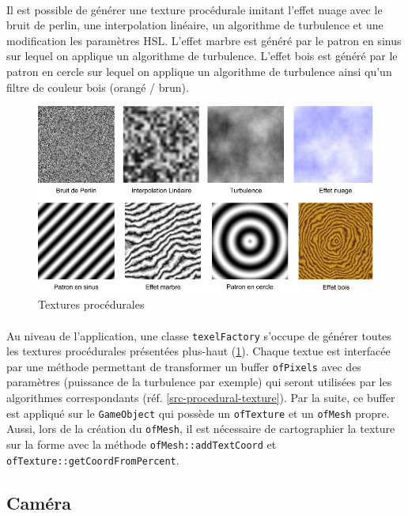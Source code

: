 \paragraph{} Il est possible de générer une texture procédurale imitant l'effet nuage avec le bruit de perlin, une interpolation linéaire, un algorithme de turbulence et une modification les paramètres HSL. L'effet marbre est généré par le patron en sinus sur lequel on applique un algorithme de turbulence. L'effet bois est généré par le patron en cercle sur lequel on applique un algorithme de turbulence ainsi qu'un filtre de couleur bois (orangé / brun).
\begin{figure}[H]
\centering
\includegraphics[width=\textwidth]{img/infog-image-procedural-texture.png}
\caption{Textures procédurales}\label{fig-procedural-texture}
\end{figure}
\paragraph{} Au niveau de l'application, une classe \texttt{texelFactory} s'occupe de générer toutes les textures procédurales présentées plus-haut (\ref{fig-procedural-texture}).  Chaque textue est interfacée par une méthode permettant de transformer un buffer \texttt{ofPixels} avec des paramètres (puissance de la turbulence par exemple) qui seront utilisées par les algorithmes correspondants (réf. \ref{src-procedural-texture}). Par la suite, ce buffer est appliqué sur le \texttt{GameObject} qui possède un \texttt{ofTexture} et un \texttt{ofMesh} propre. Aussi, lors de la création du \texttt{ofMesh}, il est nécessaire de cartographier la texture sur la forme avec la méthode \texttt{ofMesh::addTextCoord} et \texttt{ofTexture::getCoordFromPercent}.

\subsection{Caméra}
